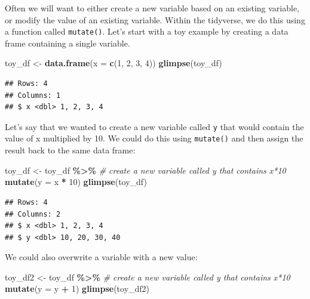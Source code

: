 \documentclass[
  12pt,
]{book}
\newenvironment{Shaded}{\begin{snugshade}}{\end{snugshade}}
\newcommand{\AttributeTok}[1]{\textcolor[rgb]{0.13,0.29,0.53}{#1}}
\newcommand{\CommentTok}[1]{\textcolor[rgb]{0.56,0.35,0.01}{\textit{#1}}}
\newcommand{\DecValTok}[1]{\textcolor[rgb]{0.00,0.00,0.81}{#1}}
\newcommand{\FunctionTok}[1]{\textcolor[rgb]{0.13,0.29,0.53}{\textbf{#1}}}
\newcommand{\NormalTok}[1]{#1}
\newcommand{\OtherTok}[1]{\textcolor[rgb]{0.56,0.35,0.01}{#1}}
\newcommand{\SpecialCharTok}[1]{\textcolor[rgb]{0.81,0.36,0.00}{\textbf{#1}}}
\begin{document}
Often we will want to either create a new variable based on an existing variable, or modify the value of an existing variable. Within the tidyverse, we do this using a function called \texttt{mutate()}. Let's start with a toy example by creating a data frame containing a single variable.

\begin{Shaded}
\begin{Highlighting}[]
\NormalTok{toy\_df }\OtherTok{\textless{}{-}} \FunctionTok{data.frame}\NormalTok{(}\AttributeTok{x =} \FunctionTok{c}\NormalTok{(}\DecValTok{1}\NormalTok{, }\DecValTok{2}\NormalTok{, }\DecValTok{3}\NormalTok{, }\DecValTok{4}\NormalTok{))}
\FunctionTok{glimpse}\NormalTok{(toy\_df)}
\end{Highlighting}
\end{Shaded}

\begin{verbatim}
## Rows: 4
## Columns: 1
## $ x <dbl> 1, 2, 3, 4
\end{verbatim}

Let's say that we wanted to create a new variable called \texttt{y} that would contain the value of x multiplied by 10. We could do this using \texttt{mutate()} and then assign the result back to the same data frame:

\begin{Shaded}
\begin{Highlighting}[]
\NormalTok{toy\_df }\OtherTok{\textless{}{-}}\NormalTok{ toy\_df }\SpecialCharTok{\%\textgreater{}\%}
  \CommentTok{\# create a new variable called y that contains x*10}
  \FunctionTok{mutate}\NormalTok{(}\AttributeTok{y =}\NormalTok{ x }\SpecialCharTok{*} \DecValTok{10}\NormalTok{)}
\FunctionTok{glimpse}\NormalTok{(toy\_df)}
\end{Highlighting}
\end{Shaded}

\begin{verbatim}
## Rows: 4
## Columns: 2
## $ x <dbl> 1, 2, 3, 4
## $ y <dbl> 10, 20, 30, 40
\end{verbatim}

We could also overwrite a variable with a new value:

\begin{Shaded}
\begin{Highlighting}[]
\NormalTok{toy\_df2 }\OtherTok{\textless{}{-}}\NormalTok{ toy\_df }\SpecialCharTok{\%\textgreater{}\%}
  \CommentTok{\# create a new variable called y that contains x*10}
  \FunctionTok{mutate}\NormalTok{(}\AttributeTok{y =}\NormalTok{ y }\SpecialCharTok{+} \DecValTok{1}\NormalTok{)}
\FunctionTok{glimpse}\NormalTok{(toy\_df2)}
\end{Highlighting}
\end{Shaded}
\end{document}
